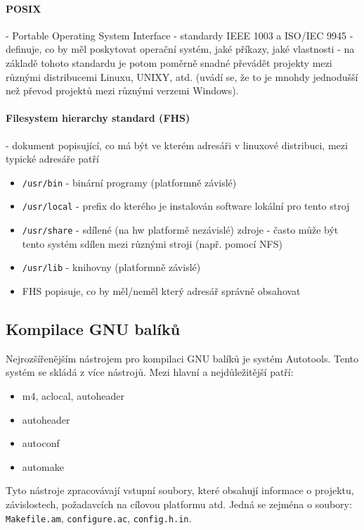 \paragraph{POSIX} - Portable Operating System Interface - standardy IEEE 1003 a ISO/IEC 9945 - definuje, co by měl poskytovat operační systém, jaké příkazy, jaké vlastnosti - na základě tohoto standardu je potom poměrně snadné převádět projekty mezi různými distribucemi Linuxu, UNIXY, atd. (uvádí se, že to je mnohdy jednodušší než převod projektů mezi různými verzemi Windows).

\paragraph{Filesystem hierarchy standard (FHS)} - dokument popisující, co má být ve kterém adresáři v linuxové distribuci, mezi typické adresáře patří
\begin{itemize}[itemsep=0px]
\item \texttt{/usr/bin} - binární programy (platformně závislé)
\item \texttt{/usr/local} - prefix do kterého je instalován software lokální pro tento stroj
\item \texttt{/usr/share} - sdílené (na hw platformě nezávislé) zdroje - často může být tento systém sdílen mezi různými stroji (např. pomocí NFS)
\item \texttt{/usr/lib} - knihovny (platformně závislé)
\item FHS popisuje, co by měl/neměl který adresář správně obsahovat
\end{itemize}

\subsection{Kompilace GNU balíků}
Nejrozšířenějším nástrojem pro kompilaci GNU balíků je systém Autotools. Tento systém se skládá z více nástrojů. Mezi hlavní a nejdůležitější patří:
\begin{itemize}[itemsep=0px]
\item m4, aclocal, autoheader
\item autoheader
\item autoconf
\item automake
\end{itemize}

Tyto nástroje zpracovávají vstupní soubory, které obsahují informace o projektu, závislostech, požadavcích na cílovou platformu atd. Jedná se zejména o soubory: \texttt{Makefile.am}, \texttt{configure.ac}, \texttt{config.h.in}.

